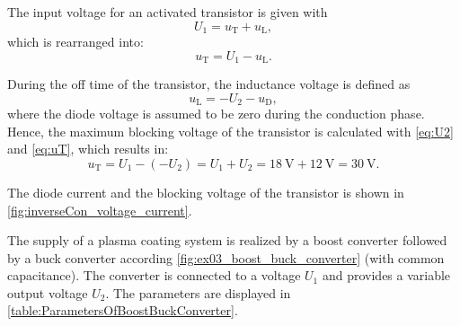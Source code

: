  \begin{solutionblock}
    The input voltage for an activated transistor is given with
    \begin{equation}
        U_1 = u_{\mathrm{T}} + u_{\mathrm{L}},
    \end{equation}
    which is rearranged into:
    \begin{equation}
        u_{\mathrm{T}} = U_1 - u_{\mathrm{L}}.
        \label{eq:uT}
    \end{equation}

    During the off time of the transistor, the inductance voltage is defined as
    \begin{equation}
        u_{\mathrm{L}} = -U_2 - u_{\mathrm{D}},
        \label{eq:U2}
    \end{equation}
    where the diode voltage is assumed to be zero during the conduction phase.
    Hence, the maximum blocking voltage of the transistor is calculated with \eqref{eq:U2} and \eqref{eq:uT}, which results in:
    \begin{equation}
        u_{\mathrm{T}} = U_1 - (-U_2)
        = U_1 + U_2 = \SI{18}{\volt} + \SI{12}{\volt} = \SI{30}{\volt}.
    \end{equation}

    The diode current and the blocking voltage of the transistor is shown in \autoref{fig:inverseCon_voltage_current}.
    
 \end{solutionblock}



The supply of a plasma coating system is realized by a boost converter followed by a buck converter according \autoref{fig:ex03_boost_buck_converter} (with common capacitance).
The converter is connected to a voltage $U_\mathrm{1}$ and provides a variable output voltage $U_\mathrm{2}$. The parameters are displayed in \autoref{table:ParametersOfBoostBuckConverter}.
\vspace{2em}\par

\par

\par



